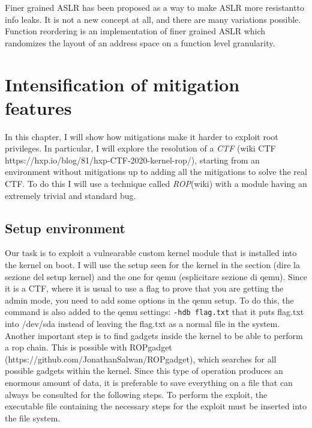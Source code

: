 \documentclass{masterthesis}
\begin{document}
Finer grained ASLR has been proposed as a way to make ASLR more resistantto info leaks. It is not a new concept at all, and there are many variations possible. Function reordering is an implementation of finer grained ASLR which randomizes the layout of an address space on a function level granularity.

\chapter{Intensification of mitigation features}
\label{ch:adding mitigation}
In this chapter, I will show how mitigations make it harder to exploit root privileges.
In particular, I will explore the resolution of a \emph{CTF} (wiki CTF https://hxp.io/blog/81/hxp-CTF-2020-kernel-rop/), starting from an environment without mitigations up to adding all the mitigations to solve the real CTF.
To do this I will use a technique called \emph{ROP}(wiki) with a module having an extremely trivial and standard bug.
\section{Setup environment}
Our task is to exploit a vulnearable custom kernel module that is installed into the kernel on boot.
I will use the setup seen for the kernel in the section (dire la sezione del setup kernel) and the one for qemu (esplicitare sezione di qemu).
Since it is a CTF, where it is usual to use a flag to prove that you are getting the admin mode, you need to add some options in the qemu setup.
To do this, the command is also added to the qemu settings:
\lstinline{-hdb flag.txt}
that it puts flag.txt into /dev/sda instead of leaving the flag.txt as a normal file in the system.
Another important step is to find gadgets inside the kernel to be able to perform a rop chain.
This is possible with ROPgadget (https://github.com/JonathanSalwan/ROPgadget), which searches for all possible gadgets within the kernel.
Since this type of operation produces an enormous amount of data, it is preferable to save everything on a file that can always be consulted for the following steps.
To perform the exploit, the executable file containing the necessary steps for the exploit must be inserted into the file system.
\end{document}
